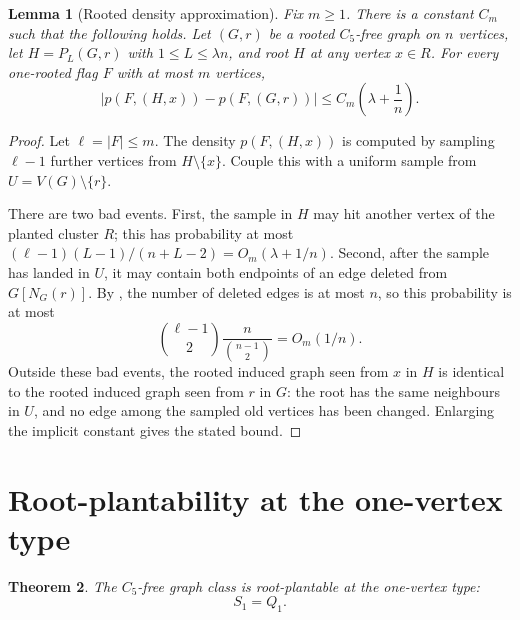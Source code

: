 \documentclass[11pt]{article}
\newtheorem{theorem}{Theorem}
\newtheorem{lemma}[theorem]{Lemma}
\theoremstyle{definition}
\begin{document}
\begin{lemma}[Rooted density approximation]\label{lem:density-approx}
Fix $m\ge1$.  There is a constant $C_m$ such that the following holds.  Let
$(G,r)$ be a rooted $C_5$-free graph on $n$ vertices, let
$H=P_L(G,r)$ with $1\le L\le \lambda n$, and root $H$ at any vertex
$x\in R$.  For every one-rooted flag $F$ with at most $m$ vertices,
\[
  \left|p(F,(H,x))-p(F,(G,r))\right|
  \le C_m\left(\lambda+\frac1n\right).
\]
\end{lemma}

\begin{proof}
Let $\ell=|F|\le m$.  The density $p(F,(H,x))$ is computed by sampling
$\ell-1$ further vertices from $H\setminus\{x\}$.  Couple this with a uniform
sample from $U=V(G)\setminus\{r\}$.

There are two bad events.  First, the sample in $H$ may hit another vertex of
the planted cluster $R$; this has probability at most
$(\ell-1)(L-1)/(n+L-2)=O_m(\lambda+1/n)$.  Second, after the sample has landed
in $U$, it may contain both endpoints of an edge deleted from $G[N_G(r)]$.  By
, the number of deleted edges is at most $n$, so this
probability is at most
\[
  \binom{\ell-1}{2}\frac{n}{\binom{n-1}{2}}
  =O_m(1/n).
\]
Outside these bad events, the rooted induced graph seen from $x$ in $H$ is
identical to the rooted induced graph seen from $r$ in $G$: the root has the
same neighbours in $U$, and no edge among the sampled old vertices has been
changed.  Enlarging the implicit constant gives the stated bound.
\end{proof}

\section{Root-plantability at the one-vertex type}

\begin{theorem}\label{thm:c5-one-root}
The $C_5$-free graph class is root-plantable at the one-vertex type:
\[
  S_1=Q_1.
\]
\end{theorem}
\end{document}

